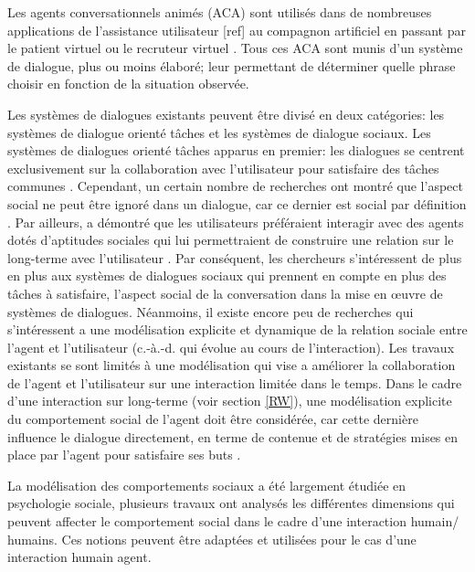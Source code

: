 \documentclass [french]{sig-alternate-05-2015}
\begin{document}
Les agents conversationnels animés (ACA) sont utilisés dans de nombreuses applications de l'assistance utilisateur [ref] au compagnon artificiel \cite{sidner2013always, riviere2014aca} en passant par le patient virtuel \cite{annesysteme} ou le recruteur virtuel \cite{jones2012affective}. Tous ces ACA sont munis d'un système de dialogue, plus ou moins élaboré; leur permettant de déterminer quelle phrase choisir en fonction de la situation observée.
\par Les systèmes de dialogues existants peuvent être divisé en deux catégories: les systèmes de dialogue orienté tâches et les systèmes de dialogue sociaux. Les systèmes de dialogues orienté tâches apparus en premier: les dialogues se centrent exclusivement sur la collaboration avec l’utilisateur pour satisfaire des tâches communes \cite{allen1995spoken, allen1996robust}. Cependant, un certain nombre de recherches ont montré que l’aspect social ne peut être ignoré dans un dialogue, car ce dernier est social par définition \cite{markopoulos2005case}. Par ailleurs, \cite{moon1998intimate} a démontré que les utilisateurs préféraient interagir avec des agents dotés d'aptitudes sociales qui lui permettraient de construire une relation sur le long-terme avec l'utilisateur \cite{bickmore2005establishing}. Par conséquent, les chercheurs s'intéressent de plus en plus aux systèmes de dialogues sociaux qui prennent en compte en plus des tâches à satisfaire, l'aspect social de la conversation dans la mise en œuvre de systèmes de dialogues. Néanmoins, il existe encore peu de recherches qui s’intéressent a une modélisation explicite et dynamique de la relation sociale entre l’agent et l’utilisateur (c.-à.-d. qui évolue au cours de l'interaction). Les travaux existants se sont limités à une modélisation qui vise a améliorer la collaboration de l’agent et l'utilisateur sur une interaction limitée dans le temps. Dans le cadre d'une interaction sur long-terme (voir section \ref{RW}), une modélisation explicite du comportement social de l’agent doit être considérée, car cette dernière influence le dialogue directement, en terme de contenue et de stratégies mises en place par l’agent pour satisfaire ses buts \cite{bickmore2012empirical}.

\par La modélisation des comportements sociaux a été largement étudiée en psychologie sociale, plusieurs travaux ont analysés les différentes dimensions qui peuvent affecter le comportement social dans le cadre d’une interaction humain/ humains. Ces notions peuvent être adaptées et utilisées pour le cas d’une interaction humain agent.
\end{document}
